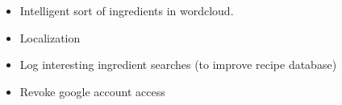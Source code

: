 \begin{itemize}
\item Intelligent sort of ingredients in wordcloud.
\item Localization
\item Log interesting ingredient searches (to improve recipe database)
\item Revoke google account access
\end{itemize}